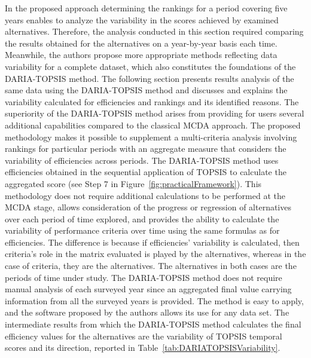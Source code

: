 \documentclass[final,5p,times,twocolumn,authoryear]{elsarticle}
\begin{document}
In the proposed approach determining the rankings for a period covering five years enables to analyze the variability in the scores achieved by examined alternatives. Therefore, the analysis conducted in this section required comparing the results obtained for the alternatives on a year-by-year basis each time. Meanwhile, the authors propose more appropriate methods reflecting data variability for a complete dataset, which also constitutes the foundations of the DARIA-TOPSIS method. The following section presents results analysis of the same data using the DARIA-TOPSIS method and discusses and explains the variability calculated for efficiencies and rankings and its identified reasons. The superiority of the DARIA-TOPSIS method arises from providing for users several additional capabilities compared to the classical MCDA approach. The proposed methodology makes it possible to supplement a multi-criteria analysis involving rankings for particular periods with an aggregate measure that considers the variability of efficiencies across periods. The DARIA-TOPSIS method uses efficiencies obtained in the sequential application of TOPSIS to calculate the aggregated score (see Step 7 in Figure~\ref{fig:practicalFramework}). This methodology does not require additional calculations to be performed at the MCDA stage, allows consideration of the progress or regression of alternatives over each period of time explored, and provides the ability to calculate the variability of performance criteria over time using the same formulas as for efficiencies. The difference is because if efficiencies' variability is calculated, then criteria's role in the matrix evaluated is played by the alternatives, whereas in the case of criteria, they are the alternatives. The alternatives in both cases are the periods of time under study. The DARIA-TOPSIS method does not require manual analysis of each surveyed year since an aggregated final value carrying information from all the surveyed years is provided. The method is easy to apply, and the software proposed by the authors allows its use for any data set. The intermediate results from which the DARIA-TOPSIS method calculates the final efficiency values for the alternatives are the variability of TOPSIS temporal scores and its direction, reported in Table~\ref{tab:DARIATOPSISVariability}.
%
\end{document}
